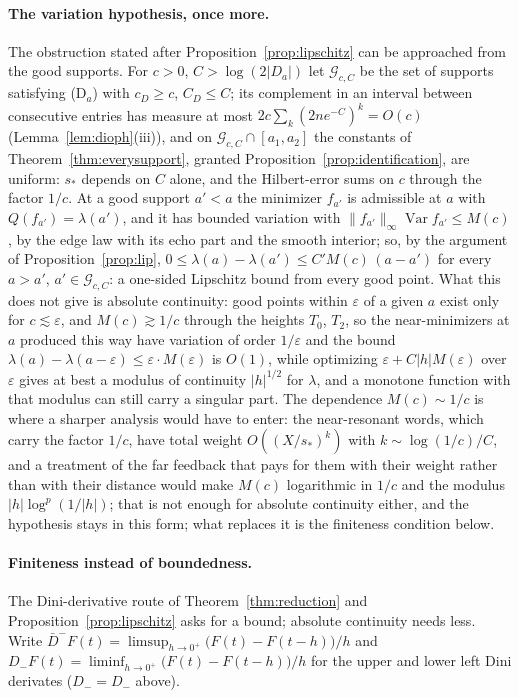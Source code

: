\documentclass[11pt]{article}
\theoremstyle{definition}
\theoremstyle{remark}
\newcommand{\Dm}{D_{-}}
\begin{document}
\paragraph*{The variation hypothesis, once more.} The obstruction stated after Proposition~\ref{prop:lipschitz} can be approached from the good supports. For $c>0$, $C>\log(2|D_a|)$ let $\mathcal G_{c,C}$ be the set of supports satisfying (D$_a$) with $c_D\ge c$, $C_D\le C$; its complement in an interval between consecutive entries has measure at most $2c\sum_k(2ne^{-C})^k=O(c)$ (Lemma~\ref{lem:dioph}(iii)), and on $\mathcal G_{c,C}\cap[a_1,a_2]$ the constants of Theorem~\ref{thm:everysupport}, granted Proposition~\ref{prop:identification}, are uniform: $s_*$ depends on $C$ alone, and the Hilbert-error sums on $c$ through the factor $1/c$. At a good support $a'<a$ the minimizer $f_{a'}$ is admissible at $a$ with $Q(f_{a'})=\lambda(a')$, and it has bounded variation with $\|f_{a'}\|_\infty\operatorname{Var}f_{a'}\le M(c)$, by the edge law with its echo part and the smooth interior; so, by the argument of Proposition~\ref{prop:lip}, $0\le\lambda(a)-\lambda(a')\le C'M(c)\,(a-a')$ for every $a>a'$, $a'\in\mathcal G_{c,C}$: a one-sided Lipschitz bound from every good point. What this does not give is absolute continuity: good points within $\varepsilon$ of a given $a$ exist only for $c\lesssim\varepsilon$, and $M(c)\gtrsim1/c$ through the heights $T_0$, $T_2$, so the near-minimizers at $a$ produced this way have variation of order $1/\varepsilon$ and the bound $\lambda(a)-\lambda(a-\varepsilon)\le\varepsilon\cdot M(\varepsilon)$ is $O(1)$, while optimizing $\varepsilon+C|h|M(\varepsilon)$ over $\varepsilon$ gives at best a modulus of continuity $|h|^{1/2}$ for $\lambda$, and a monotone function with that modulus can still carry a singular part. The dependence $M(c)\sim1/c$ is where a sharper analysis would have to enter: the near-resonant words, which carry the factor $1/c$, have total weight $O((X/s_*)^{k})$ with $k\sim\log(1/c)/C$, and a treatment of the far feedback that pays for them with their weight rather than with their distance would make $M(c)$ logarithmic in $1/c$ and the modulus $|h|\log^p(1/|h|)$; that is not enough for absolute continuity either, and the hypothesis stays in this form; what replaces it is the finiteness condition below.

\paragraph*{Finiteness instead of boundedness.} The Dini-derivative route of Theorem~\ref{thm:reduction} and Proposition~\ref{prop:lipschitz} asks for a bound; absolute continuity needs less. Write $\bar D^-F(t)=\limsup_{h\to0^+}\big(F(t)-F(t-h)\big)/h$ and $D_-F(t)=\liminf_{h\to0^+}\big(F(t)-F(t-h)\big)/h$ for the upper and lower left Dini derivates ($D_-=\Dm$ above).
\end{document}
